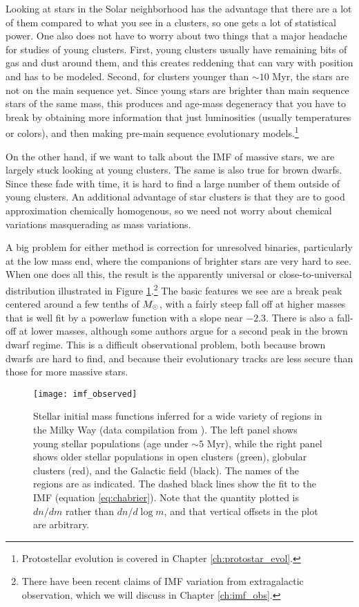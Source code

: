 Looking at stars in the Solar neighborhood has the advantage that there are a lot of them compared to what you see in a clusters, so one gets a lot of statistical power. One also does not have to worry about two things that a major headache for studies of young clusters. First, young clusters usually have remaining bits of gas and dust around them, and this creates reddening that can vary with position and has to be modeled. Second, for clusters younger than $\sim 10$ Myr, the stars are not on the main sequence yet. Since young stars are brighter than main sequence stars of the same mass, this produces and age-mass degeneracy that you have to break by obtaining more information that just luminosities (usually temperatures or colors), and then making pre-main sequence evolutionary models.\footnote{Protostellar evolution is covered in Chapter \ref{ch:protostar_evol}.}

On the other hand, if we want to talk about the IMF of massive stars, we are largely stuck looking at young clusters. The same is also true for brown dwarfs. Since these fade with time, it is hard to find a large number of them outside of young clusters. An additional advantage of star clusters is that they are to good approximation chemically homogenous, so we need not worry about chemical variations masquerading as mass variations.

A big problem for either method is correction for unresolved binaries, particularly at the low mass end, where the companions of brighter stars are very hard to see. When one does all this, the result is the apparently universal or close-to-universal distribution illustrated in Figure \ref{fig:imf_observed}.\footnote{There have been recent claims of IMF variation from extragalactic observation, which we will discuss in Chapter \ref{ch:imf_obs}.} The basic features we see are a break peak centered around a few tenths of $M_{\odot}$, with a fairly steep fall off at higher masses that is well fit by a powerlaw function with a slope near $-2.3$. There is also a fall-off at lower masses, although some authors argue for a second peak in the brown dwarf regime. This is a difficult observational problem, both because brown dwarfs are hard to find, and because their evolutionary tracks are less secure than those for more massive stars.

\begin{figure}
\texttt{[image: imf\_observed]}
\caption[Measured stellar IMFs in a variety of regions]{
\label{fig:imf_observed}
Stellar initial mass functions inferred for a wide variety of regions in the Milky Way (data compilation from \citealt{bastian10a}). The left panel shows young stellar populations (age under $\sim 5$ Myr), while the right panel shows older stellar populations in open clusters (green), globular clusters (red), and the Galactic field (black). The names of the regions are as indicated. The dashed black lines show the \citet{chabrier05a} fit to the IMF (equation \ref{eq:chabrier}). Note that the quantity plotted is $dn/dm$ rather than $dn/d\log m$, and that vertical offsets in the plot are arbitrary.
}
\end{figure}

